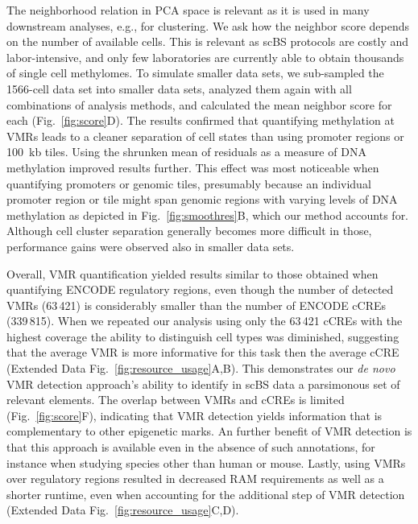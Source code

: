 \documentclass[10pt]{article}
\begin{document}
The neighborhood relation in PCA space is relevant as it is used in many downstream analyses, e.g., for clustering.
We ask how the neighbor score depends on the number of available cells.
This is relevant as scBS protocols are costly and labor-intensive, and only few laboratories are currently able to obtain thousands of single cell methylomes.
To simulate smaller data sets, we sub-sampled the 1566-cell data set into smaller data sets, analyzed them again with all combinations of analysis methods, and calculated the mean neighbor score for each (Fig.~\ref{fig:score}D).
The results confirmed that quantifying methylation at VMRs leads to a cleaner separation of cell states than using promoter regions or 100~kb tiles.
Using the shrunken mean of residuals as a measure of DNA methylation improved results further.
This effect was most noticeable when quantifying promoters or genomic tiles, presumably because an individual promoter region or tile might span genomic regions with varying levels of DNA methylation as depicted in Fig.~\ref{fig:smoothres}B, which our method accounts for.
Although cell cluster separation generally becomes more difficult in those, performance gains were observed also in smaller data sets.


Overall, VMR quantification yielded results similar to those obtained when quantifying ENCODE regulatory regions, even though the number of detected VMRs (63\,421) is considerably smaller than the number of ENCODE cCREs (339\,815).
When we repeated our analysis using only the 63\,421 cCREs with the highest coverage the ability to distinguish cell types was diminished, suggesting that the average VMR is more informative for this task then the average cCRE (Extended Data Fig.~\ref{fig:resource_usage}A,B).
This demonstrates our \textit{de novo} VMR detection approach's ability to identify in scBS data a parsimonous set of relevant elements. The overlap between VMRs and cCREs is limited (Fig.~\ref{fig:score}F), indicating that VMR detection yields information that is complementary to other epigenetic marks.
An further benefit of VMR detection is that this approach is available even in the absence of such annotations, for instance when studying species other than human or mouse.
Lastly, using VMRs over regulatory regions resulted in decreased RAM requirements as well as a shorter runtime, even when accounting for the additional step of VMR detection (Extended Data Fig.~\ref{fig:resource_usage}C,D).
\end{document}
